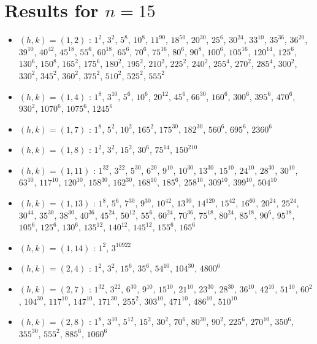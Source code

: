 \section{Results for $n=15$}
\begin{itemize}
\item $(h,k)=(1,2)$ : $1^{2}$, $3^{2}$, $5^{8}$, $10^{8}$, $11^{90}$, $18^{50}$, $20^{30}$, $25^{6}$, $30^{24}$, $33^{10}$, $35^{36}$, $36^{20}$, $39^{10}$, $40^{42}$, $45^{18}$, $55^{6}$, $60^{18}$, $65^{6}$, $70^{6}$, $75^{16}$, $80^{6}$, $90^{8}$, $100^{6}$, $105^{16}$, $120^{14}$, $125^{6}$, $130^{6}$, $150^{8}$, $165^{2}$, $175^{6}$, $180^{2}$, $195^{2}$, $210^{2}$, $225^{2}$, $240^{2}$, $255^{4}$, $270^{2}$, $285^{4}$, $300^{2}$, $330^{2}$, $345^{2}$, $360^{2}$, $375^{2}$, $510^{2}$, $525^{2}$, $555^{2}$
\item $(h,k)=(1,4)$ : $1^{8}$, $3^{10}$, $5^{6}$, $10^{6}$, $20^{12}$, $45^{6}$, $66^{30}$, $160^{6}$, $300^{6}$, $395^{6}$, $470^{6}$, $930^{2}$, $1070^{6}$, $1075^{6}$, $1245^{6}$
\item $(h,k)=(1,7)$ : $1^{8}$, $5^{2}$, $10^{2}$, $165^{2}$, $175^{30}$, $182^{30}$, $560^{6}$, $695^{6}$, $2360^{6}$
\item $(h,k)=(1,8)$ : $1^{2}$, $3^{2}$, $15^{2}$, $30^{6}$, $75^{14}$, $150^{210}$
\item $(h,k)=(1,11)$ : $1^{32}$, $3^{22}$, $5^{30}$, $6^{20}$, $9^{10}$, $10^{30}$, $13^{30}$, $15^{10}$, $24^{10}$, $28^{30}$, $30^{10}$, $63^{10}$, $117^{10}$, $120^{10}$, $158^{30}$, $162^{30}$, $168^{10}$, $185^{6}$, $258^{10}$, $309^{10}$, $399^{10}$, $504^{10}$
\item $(h,k)=(1,13)$ : $1^{8}$, $5^{6}$, $7^{30}$, $9^{30}$, $10^{42}$, $13^{30}$, $14^{120}$, $15^{42}$, $16^{60}$, $20^{24}$, $25^{24}$, $30^{44}$, $35^{30}$, $38^{30}$, $40^{36}$, $45^{24}$, $50^{12}$, $55^{6}$, $60^{24}$, $70^{36}$, $75^{18}$, $80^{24}$, $85^{18}$, $90^{6}$, $95^{18}$, $105^{6}$, $125^{6}$, $130^{6}$, $135^{12}$, $140^{12}$, $145^{12}$, $155^{6}$, $165^{6}$
\item $(h,k)=(1,14)$ : $1^{2}$, $3^{10922}$
\item $(h,k)=(2,4)$ : $1^{2}$, $3^{2}$, $15^{6}$, $35^{6}$, $54^{10}$, $104^{30}$, $4800^{6}$
\item $(h,k)=(2,7)$ : $1^{32}$, $3^{22}$, $6^{30}$, $9^{10}$, $15^{10}$, $21^{10}$, $23^{30}$, $28^{30}$, $36^{10}$, $42^{10}$, $51^{10}$, $60^{2}$, $104^{30}$, $117^{10}$, $147^{10}$, $171^{30}$, $255^{2}$, $303^{10}$, $471^{10}$, $486^{10}$, $510^{10}$
\item $(h,k)=(2,8)$ : $1^{8}$, $3^{10}$, $5^{12}$, $15^{2}$, $30^{2}$, $70^{6}$, $80^{30}$, $90^{2}$, $225^{6}$, $270^{10}$, $350^{6}$, $355^{30}$, $555^{2}$, $885^{6}$, $1060^{6}$

\end{itemize}
